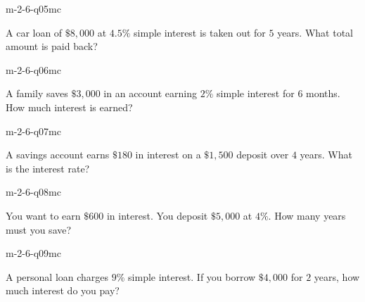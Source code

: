 \begin{practiceQuestion}{m-2-6-q05}{mc}
\begin{questionText}
A car loan of $\$8{,}000$ at $4.5\%$ simple interest is taken out for $5$ years. What total amount is paid back?
\end{questionText}
\end{practiceQuestion}

\begin{practiceQuestion}{m-2-6-q06}{mc}
\begin{questionText}
A family saves $\$3{,}000$ in an account earning $2\%$ simple interest for $6$ months. How much interest is earned?
\end{questionText}
\end{practiceQuestion}

\begin{practiceQuestion}{m-2-6-q07}{mc}
\begin{questionText}
A savings account earns $\$180$ in interest on a $\$1{,}500$ deposit over $4$ years. What is the interest rate?
\end{questionText}
\end{practiceQuestion}

\begin{practiceQuestion}{m-2-6-q08}{mc}
\begin{questionText}
You want to earn $\$600$ in interest. You deposit $\$5{,}000$ at $4\%$. How many years must you save?
\end{questionText}
\end{practiceQuestion}

\begin{practiceQuestion}{m-2-6-q09}{mc}
\begin{questionText}
A personal loan charges $9\%$ simple interest. If you borrow $\$4{,}000$ for $2$ years, how much interest do you pay?
\end{questionText}
\end{practiceQuestion}

